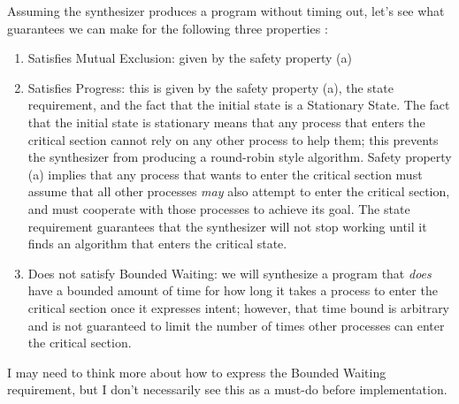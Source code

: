 \documentclass[12pt]{article}
\begin{document}
Assuming the synthesizer produces a program without timing out, let's see what guarantees we can make for the following three properties \cite{mutex}:
	\begin{enumerate}
		\item Satisfies Mutual Exclusion: given by the safety property (a)
		\item Satisfies Progress: this is given by the safety property (a),  the state requirement, and the fact that the initial state is a Stationary State.  The fact that the initial state is stationary means that any process that enters the critical section cannot rely on any other process to help them; this prevents the synthesizer from producing a round-robin style algorithm.  Safety property (a) implies that any process that wants to enter the critical section must assume that all other processes \textit{may} also attempt to enter the critical section, and must cooperate with those processes to achieve its goal.  The state requirement guarantees that the synthesizer will not stop working until it finds an algorithm that enters the critical state.  
		\item Does not satisfy Bounded Waiting: we will synthesize a program that \textit{does} have a bounded amount of time for how long it takes a process to enter the critical section once it expresses intent; however, that time bound is arbitrary and is not guaranteed to limit the number of times other processes can enter the critical section.  
	\end{enumerate}

I may need to think more about how to express the Bounded Waiting requirement, but I don't necessarily see this as a must-do before implementation.  
\end{document}
